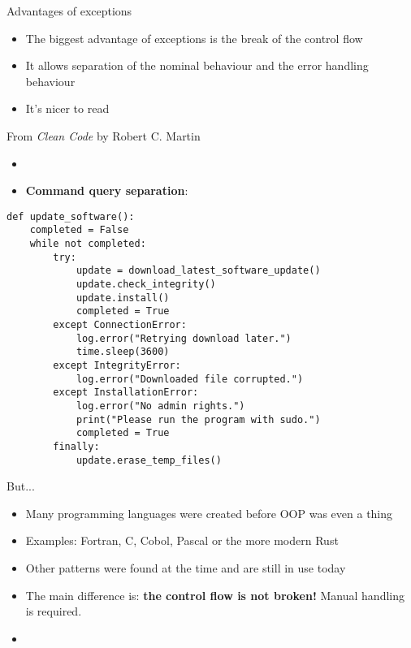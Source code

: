 \documentclass[aspectratio=169,14pt]{beamer}
\begin{document}
\begin{frame}{Advantages of exceptions}
\begin{itemize}
    \item The biggest advantage of exceptions is the break of the control flow
    \item It allows separation of the nominal behaviour and the error handling behaviour
    \item It's nicer to read
\end{itemize}
\end{frame}


\begin{frame}{From \textit{Clean Code} by Robert C. Martin}
\begin{itemize}
    \item \textit{}
    \item \textbf{Command query separation}: \textit{}
\end{itemize}
\end{frame}


\begin{frame}[fragile]{}
\begin{lstlisting}[style=pythonstyle]
def update_software():
    completed = False
    while not completed:
        try:
            update = download_latest_software_update()
            update.check_integrity()
            update.install()
            completed = True
        except ConnectionError:
            log.error("Retrying download later.")
            time.sleep(3600)
        except IntegrityError:
            log.error("Downloaded file corrupted.")
        except InstallationError:
            log.error("No admin rights.")
            print("Please run the program with sudo.")
            completed = True
        finally:
            update.erase_temp_files()
\end{lstlisting}
\end{frame}


\begin{frame}{But...}
\begin{itemize}
    \item Many programming languages were created before OOP was even a thing
    \item Examples: Fortran, C, Cobol, Pascal or the more modern Rust
    \item Other patterns were found at the time and are still in use today
    \item The main difference is: \textbf{the control flow is not broken!} Manual handling is required.
    \item \textit{}
\end{itemize}
\end{frame}
\end{document}
